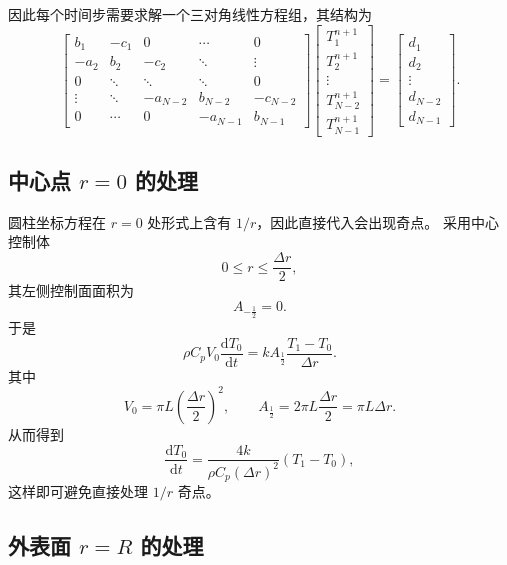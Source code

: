 \documentclass[UTF8,a4paper,12pt]{ctexart}
\begin{document}
因此每个时间步需要求解一个三对角线性方程组，其结构为
\begin{equation}
\begin{bmatrix}
b_1 & -c_1 & 0 & \cdots & 0\\
-a_2 & b_2 & -c_2 & \ddots & \vdots\\
0 & \ddots & \ddots & \ddots & 0\\
\vdots & \ddots & -a_{N-2} & b_{N-2} & -c_{N-2}\\
0 & \cdots & 0 & -a_{N-1} & b_{N-1}
\end{bmatrix}
\begin{bmatrix}
T_1^{n+1}\\
T_2^{n+1}\\
\vdots\\
T_{N-2}^{n+1}\\
T_{N-1}^{n+1}
\end{bmatrix}
=
\begin{bmatrix}
d_1\\
d_2\\
\vdots\\
d_{N-2}\\
d_{N-1}
\end{bmatrix}.
\end{equation}

\subsection{中心点 $r=0$ 的处理}

圆柱坐标方程在 $r=0$ 处形式上含有 $1/r$，因此直接代入会出现奇点。
采用中心控制体
\[
0\le r\le \frac{\Delta r}{2},
\]
其左侧控制面面积为
\begin{equation}
    A_{-\frac12}=0.
\end{equation}
于是
\begin{equation}
    \rho C_pV_0\frac{\mathrm{d}T_0}{\mathrm{d}t}
    =
    kA_{\frac12}
    \frac{T_1-T_0}{\Delta r}.
\end{equation}
其中
\begin{equation}
    V_0=\pi L\left(\frac{\Delta r}{2}\right)^2,
    \qquad
    A_{\frac12}=2\pi L\frac{\Delta r}{2}
    =\pi L\Delta r.
\end{equation}
从而得到
\begin{equation}
    \frac{\mathrm{d}T_0}{\mathrm{d}t}
    =
    \frac{4k}{\rho C_p(\Delta r)^2}
    (T_1-T_0),
    \label{eq:center-temp}
\end{equation}
这样即可避免直接处理 $1/r$ 奇点。

\subsection{外表面 $r=R$ 的处理}
\end{document}
